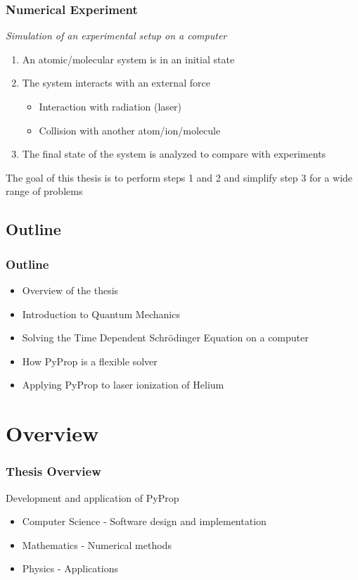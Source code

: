 \documentclass{beamer}
\begin{document}
\begin{frame}
	\frametitle{Numerical Experiment}

	\textit{Simulation of an experimental setup on a computer}

	\begin{enumerate}
		\item<2-> An atomic/molecular system is in an initial state
		\item<3-> The system interacts with an external force
			\begin{itemize}
				\item Interaction with radiation (laser)
				\item Collision with another atom/ion/molecule
			\end{itemize}
		\item<4-> The final state of the system is analyzed to compare with experiments
	\end{enumerate}	
	\vspace{0.5cm}

	{
		The goal of this thesis is to perform steps 1 and 2 and simplify step 3 for a wide range of problems
	}
\end{frame}


\subsection{Outline}

\begin{frame} %
	\frametitle{Outline}
	\begin{itemize}
		\item Overview of the thesis
		\item Introduction to Quantum Mechanics
		\item Solving the Time Dependent Schrödinger Equation on a computer
		\item How PyProp is a flexible solver 
		\item Applying PyProp to laser ionization of Helium
	\end{itemize}
\end{frame}


\section{Overview}

\begin{frame}
	\frametitle{Thesis Overview}

	Development and application of PyProp
	\begin{itemize}
		\item Computer Science - Software design and implementation
		\item Mathematics - Numerical methods
		\item Physics - Applications
	\end{itemize}
\end{frame}
\end{document}

